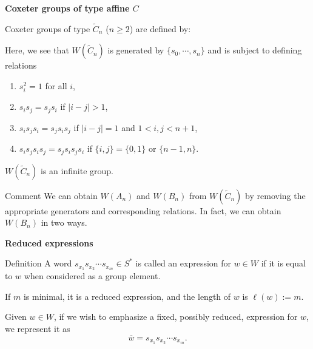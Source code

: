 \documentclass{beamer}
\newcommand{\w}{\overline{w}}
\newcommand{\C}{\widetilde{C}}
\begin{document}
\begin{frame}{\textbf{Coxeter groups of type affine $C$}}

Coxeter groups of type $\C_{n}$ ($n \geq 2$) are defined by:
\begin{figure}
\end{figure}

\pause 
Here, we see that $W(\C_{n})$ is generated by $\{s_{0}, 
\cdots, s_{n}\}$ and is subject to defining relations
\begin{enumerate}
\item $s_{i}^{2}=1$ for all $i$,
\item $s_{i}s_{j}=s_{j}s_{i}$ if $|i-j|>1$,
\item $s_{i}s_{j}s_{i}=s_{j}s_{i}s_{j}$ if $|i-j|=1$ and $1< i,j < n+1$, 
\item $s_{i}s_{j}s_{i}s_{j}=s_{j}s_{i}s_{j}s_{i}$ if $\{i,j\}=\{0,1\}$ or 
$\{n-1,n\}$.
\end{enumerate}
\pause 
\bigskip
$W(\C_{n})$ is an infinite group.

\pause

\begin{block}{Comment}
We can obtain $W(A_{n})$ and $W(B_{n})$ from $W(\C_{n})$ by removing the 
appropriate generators and corresponding relations.  In fact, 
we can obtain $W(B_{n})$ in two ways.
\end{block}

\end{frame}


\begin{frame}{\textbf{Reduced expressions}}

\begin{block}{Definition}
A word $s_{x_1}s_{x_2}\cdots s_{x_m}\in S^{*}$ is called an \alert
{expression} for $w\in W$ if it is equal to $w$ when considered as 
a group element.

\vspace{1em}
\pause

If $m$ is minimal, it is a \alert{reduced expression}, and the \alert
{length} of $w$ is $\ell(w):=m$.

\vspace{1em}
\pause

Given $w \in W$, if we wish to emphasize a fixed, possibly reduced, 
expression for $w$, we represent it as
\[
\w=s_{x_1}s_{x_2}\cdots s_{x_m}.
\]
\end{block}

\end{frame}
\end{document}
